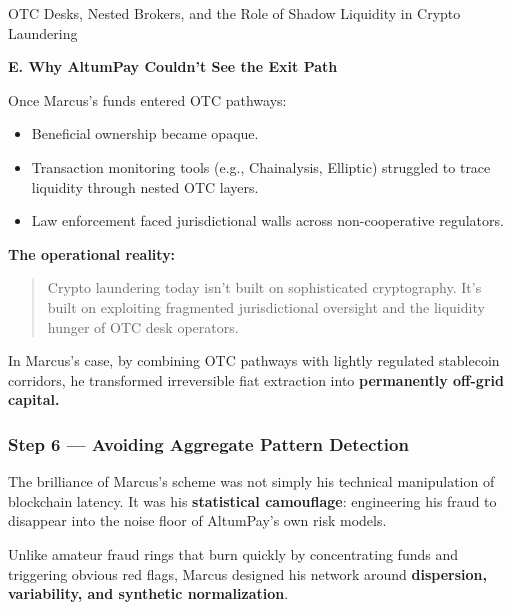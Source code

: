 \begin{HistoricalSidebar}{OTC Desks, Nested Brokers, and the Role of Shadow Liquidity in Crypto Laundering}
    \medskip
    
    \textbf{E. Why AltumPay Couldn’t See the Exit Path}
    
    Once Marcus’s funds entered OTC pathways:
    
    \begin{itemize}
        \item Beneficial ownership became opaque.
        \item Transaction monitoring tools (e.g., Chainalysis, Elliptic) struggled to trace liquidity through nested OTC layers.
        \item Law enforcement faced jurisdictional walls across non-cooperative regulators.
    \end{itemize}
    
    \medskip
    
    \textbf{The operational reality:}
    
    \begin{quote}
    Crypto laundering today isn’t built on sophisticated cryptography.  
    It’s built on exploiting fragmented jurisdictional oversight and the liquidity hunger of OTC desk operators.
    \end{quote}
    
    \medskip
    
    In Marcus’s case, by combining OTC pathways with lightly regulated stablecoin corridors, he transformed irreversible fiat extraction into \textbf{permanently off-grid capital.}
    
\end{HistoricalSidebar}

\medskip

\subsubsection*{Step 6 --- Avoiding Aggregate Pattern Detection}

The brilliance of Marcus’s scheme was not simply his technical manipulation of blockchain latency.  
It was his \textbf{statistical camouflage}: engineering his fraud to disappear into the noise floor of AltumPay’s own risk models.

\medskip

Unlike amateur fraud rings that burn quickly by concentrating funds and triggering obvious red flags, Marcus designed his network around \textbf{dispersion, variability, and synthetic normalization}.

\medskip

